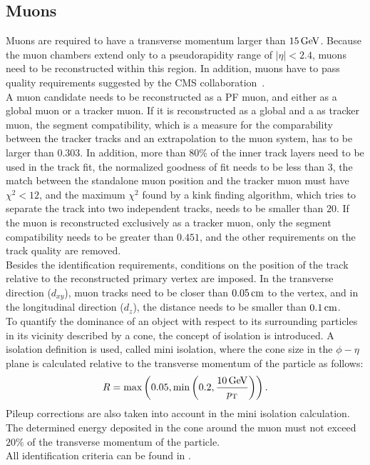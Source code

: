 \subsection{Muons}
Muons are required to have a transverse momentum larger than $15\,\text{Ge\hspace{-.08em}V}$. Because the muon chambers extend only to a pseudorapidity range of $|\eta|<2.4$, muons need to be reconstructed within this region. In addition, muons have to pass quality requirements suggested by the CMS collaboration~\cite{MuonIDPerf}.\\
A muon candidate needs to be reconstructed as a PF muon, and either as a global muon or a tracker muon. If it is reconstructed as a global and a as tracker muon, the segment compatibility, which is a measure for the comparability between the tracker tracks and an extrapolation to the muon system, has to be larger than $0.303$. In addition, more than $80\%$ of the inner track layers need to be used in the track fit, the normalized goodness of fit needs to be less than $3$, the match between the standalone muon position and the tracker muon must have $\chi^2<12$, and the maximum $\chi^2$ found by a kink finding algorithm, which tries to separate the track into two independent tracks, needs to be smaller than $20$. If the muon is reconstructed exclusively as a tracker muon, only the segment compatibility needs to be greater than $0.451$, and the other requirements on the track quality are removed.\\
Besides the identification requirements, conditions on the position of the track relative to the reconstructed primary vertex are imposed. In the transverse direction ($d_{xy}$), muon tracks need to be closer than $0.05\,\text{cm}$ to the vertex, and in the longitudinal direction ($d_z$), the distance needs to be smaller than $0.1\,\text{cm}$.
\\To quantify the dominance of an object with respect to its surrounding particles in its vicinity described by a cone, the concept of isolation is introduced. A isolation definition is used, called mini isolation, where the cone size in the $\phi-\eta$ plane is calculated relative to the transverse momentum of the particle as follows:
\begin{equation}
 R = \text{max}\left(0.05,\text{min}\left(0.2,\frac{10\,\text{Ge\hspace{-.08em}V}}{p_{\mathrm{T}}}\right)\right).
\end{equation}
Pileup corrections are also taken into account in the mini isolation calculation.
The determined energy deposited in the cone around the muon must not exceed $20\%$ of the transverse momentum of the particle.\\
All identification criteria can be found in .


